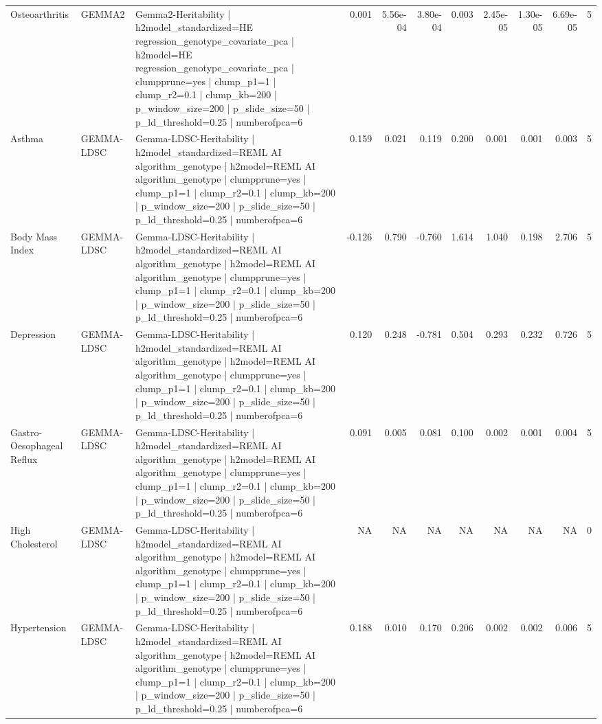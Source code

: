 \begin{landscape}
\begin{longtable}{p{2.4cm}p{1.8cm}p{6.0cm}rrrrrrrr}
Osteoarthritis & GEMMA2 & Gemma2-Heritability | h2model\_standardized=HE regression\_genotype\_covariate\_pca | h2model=HE regression\_genotype\_covariate\_pca | clumpprune=yes | clump\_p1=1 | clump\_r2=0.1 | clump\_kb=200 | p\_window\_size=200 | p\_slide\_size=50 | p\_ld\_threshold=0.25 | numberofpca=6 & 0.001 & 5.56e-04 & 3.80e-04 & 0.003 & 2.45e-05 & 1.30e-05 & 6.69e-05 & 5 \\
Asthma & GEMMA-LDSC & Gemma-LDSC-Heritability | h2model\_standardized=REML AI algorithm\_genotype | h2model=REML AI algorithm\_genotype | clumpprune=yes | clump\_p1=1 | clump\_r2=0.1 | clump\_kb=200 | p\_window\_size=200 | p\_slide\_size=50 | p\_ld\_threshold=0.25 | numberofpca=6 & 0.159 & 0.021 & 0.119 & 0.200 & 0.001 & 0.001 & 0.003 & 5 \\
Body Mass Index & GEMMA-LDSC & Gemma-LDSC-Heritability | h2model\_standardized=REML AI algorithm\_genotype | h2model=REML AI algorithm\_genotype | clumpprune=yes | clump\_p1=1 | clump\_r2=0.1 | clump\_kb=200 | p\_window\_size=200 | p\_slide\_size=50 | p\_ld\_threshold=0.25 | numberofpca=6 & -0.126 & 0.790 & -0.760 & 1.614 & 1.040 & 0.198 & 2.706 & 5 \\
Depression & GEMMA-LDSC & Gemma-LDSC-Heritability | h2model\_standardized=REML AI algorithm\_genotype | h2model=REML AI algorithm\_genotype | clumpprune=yes | clump\_p1=1 | clump\_r2=0.1 | clump\_kb=200 | p\_window\_size=200 | p\_slide\_size=50 | p\_ld\_threshold=0.25 | numberofpca=6 & 0.120 & 0.248 & -0.781 & 0.504 & 0.293 & 0.232 & 0.726 & 5 \\
Gastro-Oesophageal Reflux & GEMMA-LDSC & Gemma-LDSC-Heritability | h2model\_standardized=REML AI algorithm\_genotype | h2model=REML AI algorithm\_genotype | clumpprune=yes | clump\_p1=1 | clump\_r2=0.1 | clump\_kb=200 | p\_window\_size=200 | p\_slide\_size=50 | p\_ld\_threshold=0.25 | numberofpca=6 & 0.091 & 0.005 & 0.081 & 0.100 & 0.002 & 0.001 & 0.004 & 5 \\
High Cholesterol & GEMMA-LDSC & Gemma-LDSC-Heritability | h2model\_standardized=REML AI algorithm\_genotype | h2model=REML AI algorithm\_genotype | clumpprune=yes | clump\_p1=1 | clump\_r2=0.1 | clump\_kb=200 | p\_window\_size=200 | p\_slide\_size=50 | p\_ld\_threshold=0.25 | numberofpca=6 & NA & NA & NA & NA & NA & NA & NA & 0 \\
Hypertension & GEMMA-LDSC & Gemma-LDSC-Heritability | h2model\_standardized=REML AI algorithm\_genotype | h2model=REML AI algorithm\_genotype | clumpprune=yes | clump\_p1=1 | clump\_r2=0.1 | clump\_kb=200 | p\_window\_size=200 | p\_slide\_size=50 | p\_ld\_threshold=0.25 | numberofpca=6 & 0.188 & 0.010 & 0.170 & 0.206 & 0.002 & 0.002 & 0.006 & 5 \\

\end{longtable}
\end{landscape}
